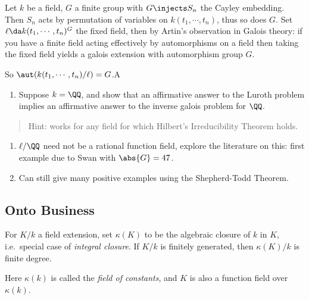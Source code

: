 \begin{exercise}

Let \(k\) be a field, \(G\) a finite group with \(G\injects S_n\) the
Cayley embedding. Then \(S_n\) acts by permutation of variables on
\(k(t_1, \cdots, t_n)\), thus so does \(G\). Set
\(\ell \da k(t_1, \cdots, t_n)^G\) the fixed field, then by Artin's
observation in Galois theory: if you have a finite field acting
effectively by automorphisms on a field then taking the fixed field
yields a galois extension with automorphism group \(G\).

So \(\aut(k(t_1, \cdots, t_n)/ \ell) = G\).A

\begin{enumerate}
\def\labelenumi{\alph{enumi}.}
\tightlist
\item
  Suppose \(k=\QQ\), and show that an affirmative answer to the Luroth
  problem implies an affirmative answer to the inverse galois problem
  for \(\QQ\).
\end{enumerate}

\begin{quote}
Hint: works for any field for which Hilbert's Irreducibility Theorem
holds.
\end{quote}

\begin{enumerate}
\def\labelenumi{\alph{enumi}.}
\setcounter{enumi}{1}
\item
  \(\ell /\QQ\) need not be a rational function field, explore the
  literature on this: first example due to Swan with \(\abs{G} = 47\).
\item
  Can still give many positive examples using the Shepherd-Todd Theorem.
\end{enumerate}

\end{exercise}


\hypertarget{onto-business}{%
\subsection{Onto Business}\label{onto-business}}

\begin{definition}[?]

For \(K/k\) a field extension, set \(\kappa(K)\) to be the algebraic
closure of \(k\) in \(K\), i.e.~special case of \emph{integral closure}.
If \(K/k\) is finitely generated, then \(\kappa(K)/k\) is finite degree.

Here \(\kappa(k)\) is called the \emph{field of constants}, and \(K\) is
also a function field over \(\kappa(k)\).

\end{definition}

